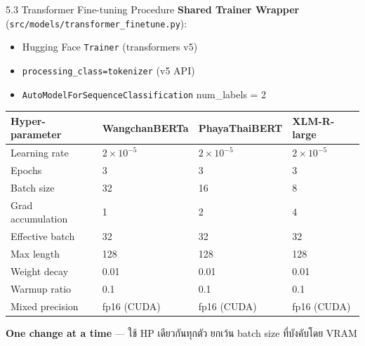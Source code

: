 \documentclass[aspectratio=169,11pt,xcolor=dvipsnames]{beamer}
\newcommand{\hl}[1]{\textcolor{kmitlOrange}{\textbf{#1}}}
\begin{document}
\begin{frame}{5.3 Transformer Fine-tuning Procedure}
  \textbf{Shared Trainer Wrapper} (\texttt{src/models/transformer\_finetune.py}):
  \begin{itemize}
    \item Hugging Face \texttt{Trainer} (transformers v5)
    \item \texttt{processing\_class=tokenizer} (v5 API)
    \item \texttt{AutoModelForSequenceClassification} num\_labels = 2
  \end{itemize}
  \vspace{0.3em}
  \footnotesize
  \begin{tabular}{p{2.8cm}p{2.5cm}p{2.5cm}p{2.5cm}}
    \toprule
    \textbf{Hyper-parameter} & \textbf{WangchanBERTa} & \textbf{PhayaThaiBERT} & \textbf{XLM-R-large}\\
    \midrule
    Learning rate    & $2 \times 10^{-5}$ & $2 \times 10^{-5}$ & $2 \times 10^{-5}$\\
    Epochs           & 3 & 3 & 3\\
    Batch size       & 32 & 16 & 8\\
    Grad accumulation & 1 & 2 & 4\\
    Effective batch  & 32 & 32 & 32\\
    Max length       & 128 & 128 & 128\\
    Weight decay     & 0.01 & 0.01 & 0.01\\
    Warmup ratio     & 0.1 & 0.1 & 0.1\\
    Mixed precision  & fp16 (CUDA) & fp16 (CUDA) & fp16 (CUDA)\\
    \bottomrule
  \end{tabular}
  \vspace{0.4em}
  \begin{center}
    \scriptsize \hl{One change at a time} — ใช้ HP เดียวกันทุกตัว ยกเว้น batch size ที่บังคับโดย VRAM
  \end{center}
\end{frame}
\end{document}
